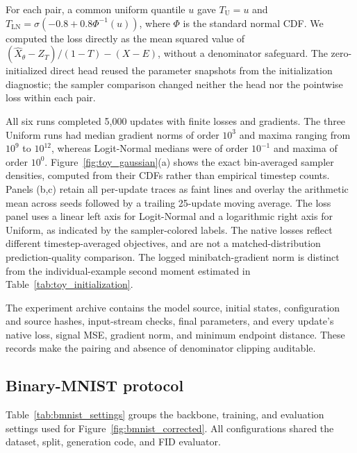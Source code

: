 \documentclass{article}
\theoremstyle{plain}
\theoremstyle{definition}
\theoremstyle{remark}
\begin{document}
For each pair, a common uniform quantile $u$ gave $T_{\mathrm U}=u$ and $T_{\mathrm{LN}}=\sigma(-0.8+0.8\Phi^{-1}(u))$, where $\Phi$ is the standard normal CDF. We computed the loss directly as the mean squared value of $(\hat X_\theta-Z_T)/(1-T)-(X-E)$, without a denominator safeguard. The zero-initialized direct head reused the parameter snapshots from the initialization diagnostic; the sampler comparison changed neither the head nor the pointwise loss within each pair.

All six runs completed 5,000 updates with finite losses and gradients. The three Uniform runs had median gradient norms of order $10^3$ and maxima ranging from $10^9$ to $10^{12}$, whereas Logit-Normal medians were of order $10^{-1}$ and maxima of order $10^0$. Figure~\ref{fig:toy_gaussian}(a) shows the exact bin-averaged sampler densities, computed from their CDFs rather than empirical timestep counts. Panels (b,c) retain all per-update traces as faint lines and overlay the arithmetic mean across seeds followed by a trailing 25-update moving average. The loss panel uses a linear left axis for Logit-Normal and a logarithmic right axis for Uniform, as indicated by the sampler-colored labels. The native losses reflect different timestep-averaged objectives, and are not a matched-distribution prediction-quality comparison. The logged minibatch-gradient norm is distinct from the individual-example second moment estimated in Table~\ref{tab:toy_initialization}.

The experiment archive contains the model source, initial states, configuration and source hashes, input-stream checks, final parameters, and every update's native loss, signal MSE, gradient norm, and minimum endpoint distance. These records make the pairing and absence of denominator clipping auditable.

\FloatBarrier
\subsection{Binary-MNIST protocol}
\label{app:bmnist_protocol}

Table~\ref{tab:bmnist_settings} groups the backbone, training, and evaluation settings used for Figure~\ref{fig:bmnist_corrected}. All configurations shared the dataset, split, generation code, and FID evaluator.
\end{document}
